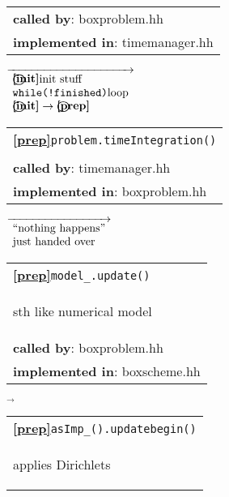 \begin{landscape}
{\begin{tabular}{|l|}
    \textbf{called by}: {boxproblem.hh}\\
    \textbf{implemented in}: {timemanager.hh}\\  
    \hline
  \end{tabular} 
{\scriptsize
    $\overrightarrow{ %
      \begin{array}{l} %
	\textbf{\textcircled{\ref{init}}}\textnormal{init stuff}\\
	\textnormal{\texttt{while(!finished)}loop}\\
	\textbf{\textbf{\textcircled{\ref{init}}}} \rightarrow \textbf{\textcircled{\ref{prep}} }
      \end{array}
    }$}
  \begin{tabular}{|l|}
    \hline
    \textbf{\textcircled{\ref{prep}}}\verb+problem.timeIntegration()+ \\
    \begin{scriptsize}\end{scriptsize}\\
    \textbf{called by}: timemanager.hh\\
    \textbf{implemented in}: boxproblem.hh\\  
\hline
  \end{tabular}    
\nextline
    {\scriptsize$\overrightarrow{
      \begin{array}{l}
	\textnormal{``nothing happens''} \\
	\textnormal{just handed over}
      \end{array}
    }$}
      \begin{tabular}{|l|}
    \hline
    \textbf{\textcircled{\ref{prep}}}\verb+model_.update()+ \\
    \begin{scriptsize}sth like numerical model\end{scriptsize}\\
    \textbf{called by}: boxproblem.hh\\
    \textbf{implemented in}: boxscheme.hh\\  
	\hline
  \end{tabular}
    $\overrightarrow{}$
    \begin{tabular}{|l|}
      \hline
     \textbf{\textcircled{\ref{prep}}}\verb+asImp_().updatebegin()+ \\
    \begin{scriptsize}applies Dirichlets\end{scriptsize}\\

\end{tabular}}
\end{landscape}
